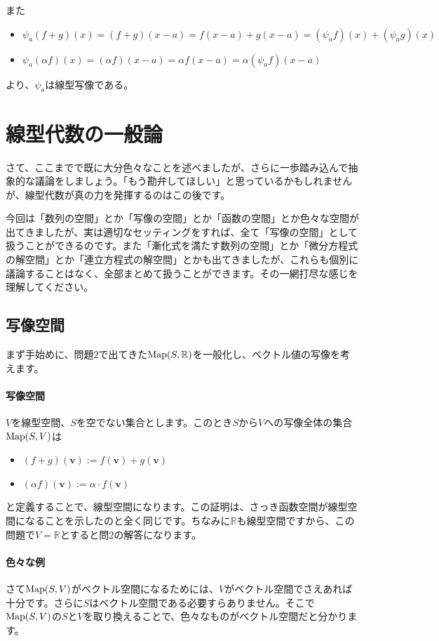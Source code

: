 また
\begin{itemize}
\item $\psi_a(f + g)(x) = (f + g)(x-a) = f(x - a) + g( x - a) = (\psi_a f)(x) + (\psi_a g)(x)$
\item $\psi_a(\alpha f)(x) = (\alpha f)(x - a) = \alpha f(x - a) = \alpha (\psi_a f)(x - a)$
\end{itemize}
より、$\psi_a$は線型写像である。

\section{線型代数の一般論}

さて、ここまでで既に大分色々なことを述べましたが、さらに一歩踏み込んで抽象的な議論をしましょう。「もう勘弁してほしい」と思っているかもしれませんが、線型代数が真の力を発揮するのはこの後です。

今回は「数列の空間」とか「写像の空間」とか「函数の空間」とか色々な空間が出てきましたが、実は適切なセッティングをすれば、全て「写像の空間」として扱うことができるのです。また「漸化式を満たす数列の空間」とか「微分方程式の解空間」とか「連立方程式の解空間」とかも出てきましたが、これらも個別に議論することはなく、全部まとめて扱うことができます。その一網打尽な感じを理解してください。

\subsection{写像空間}

まず手始めに、問題$2$で出てきた$\operatorname{Map}(S,\mathbb{R})$を一般化し、ベクトル値の写像を考えます。

\paragraph{写像空間} $V$を線型空間、$S$を空でない集合とします。このとき$S$から$V$への写像全体の集合$\operatorname{Map}(S, V)$は
\begin{itemize}
\item $(f + g)(\bm{v}) := f(\bm{v}) + g(\bm{v})$
\item $(\alpha f)(\bm{v}) := \alpha\cdot f(\bm{v})$
\end{itemize}
と定義することで、線型空間になります。この証明は、さっき函数空間が線型空間になることを示したのと全く同じです。ちなみに$\mathbb{R}$も線型空間ですから、この問題で$V = \mathbb{R}$とすると問2の解答になります。

\paragraph{色々な例}
さて$\operatorname{Map}(S, V)$がベクトル空間になるためには、$V$がベクトル空間でさえあれば十分です。さらに$S$はベクトル空間である必要すらありません。そこで$\operatorname{Map}(S, V)$の$S$と$V$を取り換えることで、色々なものがベクトル空間だと分かります。

